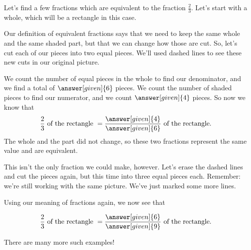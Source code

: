 \documentclass{ximera}
\begin{document}
\begin{example}
Let's find a few fractions which are equivalent to the fraction $\frac{2}{3}$. Let's start with a whole, which will be a rectangle in this case. 

\begin{image}  \end{image}

Our definition of equivalent fractions says that we need to keep the same whole and the same shaded part, but that we can change how those are cut. So, let's cut each of our pieces into two equal pieces. We'll used dashed lines to see these new cuts in our original picture.

\begin{image}  \end{image}

We count the number of equal pieces in the whole to find our denominator, and we find a total of $\answer[given]{6}$ pieces. We count the number of shaded pieces to find our numerator, and we count $\answer[given]{4}$ pieces. So now we know that 
\[
\frac{2}{3} \textrm{ of the rectangle } = \frac{\answer[given]{4}}{\answer[given]{6}} \textrm{ of the rectangle.}
\]
The whole and the part did not change, so these two fractions represent the same value and are equivalent.


This isn't the only fraction we could make, however. Let's erase the dashed lines and cut the pieces again, but this time into three equal pieces each. Remember: we're still working with the same picture. We've just marked some more lines.

\begin{image}  \end{image}

Using our meaning of fractions again, we now see that 

\[
\frac{2}{3} \textrm{ of the rectangle } = \frac{\answer[given]{6}}{\answer[given]{9}} \textrm{ of the rectangle.}
\]

There are many more such examples!
\end{example}
\end{document}
